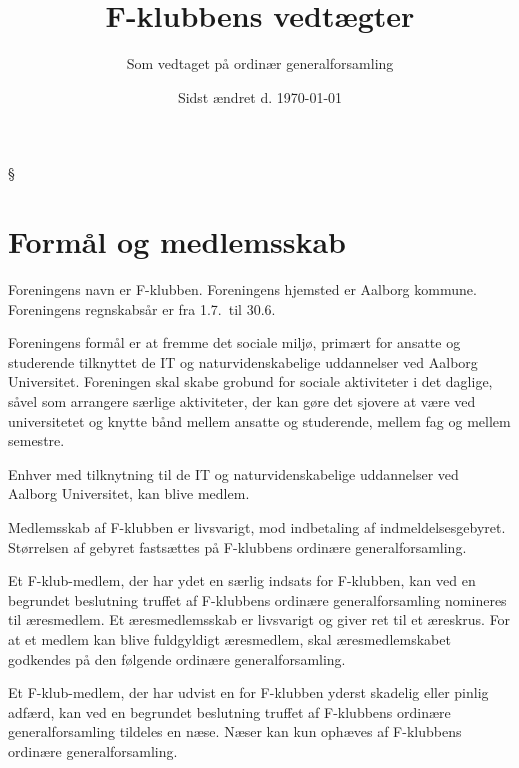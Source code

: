 \documentclass[a4paper,12pt,danish]{article}
\title{\bf F-klubbens vedtægter}
\author{Som vedtaget på ordinær generalforsamling}
\date{Sidst ændret d. \today}
\begin{document}
\maketitle





\begin{list}
{\S {}}{}
\section{Formål og medlemsskab}
\item Foreningens navn er F-klubben. Foreningens hjemsted er Aalborg
  kommune. Foreningens regnskabsår er fra 1.7.\ til 30.6.
  
\item Foreningens formål er at fremme det sociale miljø,
  primært for ansatte og studerende tilknyttet de IT og
  naturvidenskabelige uddannelser ved Aalborg Universitet. Foreningen
  skal skabe grobund for sociale aktiviteter i det daglige, såvel
  som arrangere særlige aktiviteter, der kan gøre det sjovere at
  være ved universitetet og knytte bånd mellem ansatte og
  studerende, mellem fag og mellem semestre.

\item Enhver med tilknytning til de IT og naturvidenskabelige uddannelser ved Aalborg Universitet, kan blive medlem.

\item Medlemsskab af F-klubben er livsvarigt, mod indbetaling af indmeldelsesgebyret.
  Størrelsen af gebyret fastsættes på F-klubbens ordinære generalforsamling.
  
\item Et F-klub-medlem, der har ydet en særlig indsats for
  F-klubben, kan ved en begrundet beslutning truffet af F-klubbens
  ordinære generalforsamling nomineres til æresmedlem. Et
  æresmedlemsskab er livsvarigt og giver ret til et æreskrus. For
  at et medlem kan blive fuldgyldigt æresmedlem, skal æresmedlemskabet
	godkendes på den følgende ordinære
  generalforsamling.
  
\item Et F-klub-medlem, der har udvist en for F-klubben yderst
  skadelig eller pinlig adfærd, kan ved en begrundet beslutning
  truffet af F-klubbens ordinære generalforsamling tildeles en
  næse.  Næser kan kun ophæves af F-klubbens ordinære
  generalforsamling.
  


\end{list}
\end{document}
